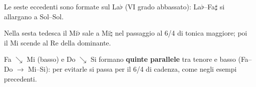 \begin{esempio}
	\label{ex:italiana_francese_maggiore}
	Le seste eccedenti sono formate sul La$\flat$ (VI grado abbassato): La$\flat$--Fa$\sharp$ si allargano a Sol--Sol.
\end{esempio}

\begin{esempio}
	\label{ex:tedesca_maggiore}
	Nella sesta tedesca il Mi$\flat$ sale a Mi$\natural$ nel passaggio al 6/4 di tonica maggiore; poi il Mi scende al Re della dominante.
\end{esempio}

\begin{errore}
	\label{err:tedesca_diretta}
	Fa $\searrow$ Mi (basso) e Do $\searrow$ Si formano \textbf{quinte parallele} tra tenore e basso (Fa--Do $\rightarrow$ Mi--Si): per evitarle si passa per il 6/4 di cadenza, come negli esempi precedenti.
\end{errore}
